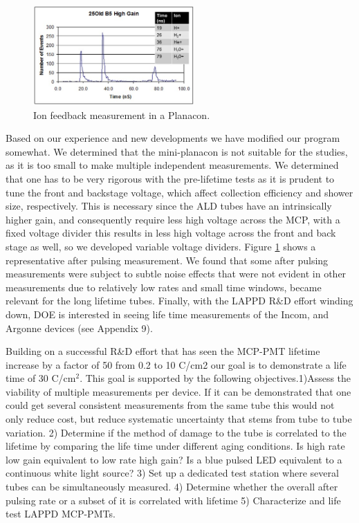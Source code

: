 \begin{figure}[htb]
\centering
\includegraphics[width=0.55\textwidth]{images/figure3Brandt.jpg}
\caption[]{Ion feedback measurement in a Planacon.}
\label{fig:ionfeedback}
\end{figure}

Based on our experience and new developments we have modified our program somewhat. We determined that the mini-planacon is not suitable for the studies, as it is too small to make multiple independent measurements. We determined that one has to be very rigorous with the pre-lifetime tests as it is prudent to tune the front and backstage voltage, which affect collection efficiency and shower size, respectively. This is necessary since the ALD tubes have an intrinsically higher gain, and consequently require less high voltage across the MCP, with a fixed voltage divider this results in less high voltage across the front and back stage as well, so we developed variable voltage dividers. Figure \ref{fig:ionfeedback} shows a representative after pulsing measurement. We found that some  after pulsing measurements were subject to subtle noise effects that were not evident in other measurements due to relatively low rates and small time windows, became relevant for the long lifetime tubes.  Finally, with the LAPPD R$\&$D effort winding down, DOE is interested in seeing life time measurements of the Incom, and Argonne devices (see Appendix 9). 


Building on a successful R\&D effort that has seen the MCP-PMT  lifetime increase by a factor of 50 from 0.2 to 10 C/cm2  our goal is to demonstrate a life time of 30 C/cm$^{2}$. This goal is supported by the following objectives.1)Assess the viability of multiple measurements per device. If it can be demonstrated that one could get several consistent measurements from the same tube this would not only reduce cost, but reduce systematic uncertainty that stems from tube to tube variation. 2) Determine if the method of damage to the tube is correlated to the lifetime by comparing the life time under different aging conditions.  Is high rate low gain equivalent to low rate high gain?  Is a blue pulsed LED equivalent to a continuous white light source? 3) Set up a dedicated test station where several tubes can be simultaneously measured. 4) Determine whether the overall after pulsing rate or a subset of it is correlated with lifetime 5) Characterize and life test LAPPD MCP-PMTs.

